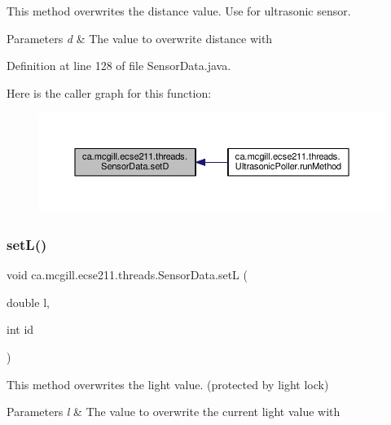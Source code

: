This method overwrites the distance value. Use for ultrasonic sensor.


\begin{DoxyParams}{Parameters}
{\em d} & The value to overwrite distance with \\
\hline
\end{DoxyParams}


Definition at line 128 of file Sensor\+Data.\+java.

Here is the caller graph for this function\+:
\nopagebreak
\begin{figure}[H]
\begin{center}
\leavevmode
\includegraphics[width=350pt]{classca_1_1mcgill_1_1ecse211_1_1threads_1_1_sensor_data_a2c1f8e625478b89aabe6e9911e482ef3_icgraph}
\end{center}
\end{figure}
\mbox{\label{classca_1_1mcgill_1_1ecse211_1_1threads_1_1_sensor_data_a1c2c38354fc5a66b4667e1d47ab6b20b}} 
\subsubsection{\texorpdfstring{set\+L()}{setL()}}
{\footnotesize\ttfamily void ca.\+mcgill.\+ecse211.\+threads.\+Sensor\+Data.\+setL (\begin{DoxyParamCaption}\item[{double}]{l,  }\item[{int}]{id }\end{DoxyParamCaption})}

This method overwrites the light value. (protected by light lock)


\begin{DoxyParams}{Parameters}
{\em l} & The value to overwrite the current light value with \\
\hline
\end{DoxyParams}


